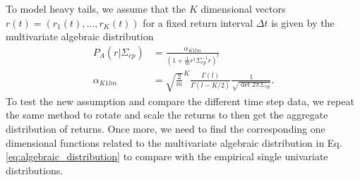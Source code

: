 To model heavy tails, we assume that the $K$ dimensional vectors
$r \left( t \right) = \left( r_{1} \left( t \right), \ldots, r_{K} \left( t \right) \right)$
for a fixed return interval $\Delta t$ is given by the multivariate algebraic
distribution
\begin{align}
    P_{A} \left( r | \Sigma_{ep} \right)
    &= \frac{\alpha_{K1lm}}{\left( 1 + \frac{1}{m} r^{\dagger}
    \Sigma^{-1}_{ep} r \right)^{l}}\label{eq:algebraic_distribution} \\
    \alpha_{K1lm} &= {\sqrt{\frac{2}{m}}}^{K}
    \frac{\Gamma \left( l \right)}{\Gamma \left( l - K/2 \right)}
    \frac{1}{\sqrt{\det 2 \pi \Sigma_{ep}}}.
\end{align}
To test the new assumption and compare the different time step data, we repeat
the same method to rotate and scale the returns to then get the aggregate
distribution of returns. Once more, we need to find the corresponding one
dimensional functions related to the multivariate algebraic distribution in Eq.
\ref{eq:algebraic_distribution} to compare with the empirical single univariate
distributions.

